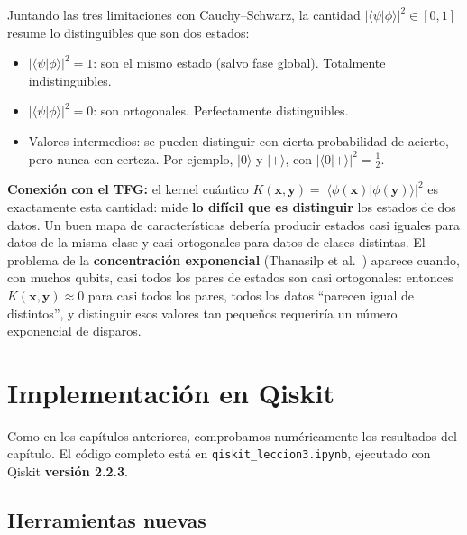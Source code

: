 \documentclass[11pt, a4paper, twoside, openright]{report}
\begin{document}
\begin{tcolorbox}[colback=blue!5!white,colframe=blue!75!black,title=\textbf{Nota Aclaratoria: El producto interno mide lo distinguibles que son dos estados}]
Juntando las tres limitaciones con Cauchy--Schwarz, la cantidad $|\langle\psi|\phi\rangle|^2\in[0,1]$ resume lo distinguibles que son dos estados:
\begin{itemize}
    \item $|\langle\psi|\phi\rangle|^2 = 1$: son el mismo estado (salvo fase global). Totalmente indistinguibles.
    \item $|\langle\psi|\phi\rangle|^2 = 0$: son ortogonales. Perfectamente distinguibles.
    \item Valores intermedios: se pueden distinguir con cierta probabilidad de acierto, pero nunca con certeza. Por ejemplo, $|0\rangle$ y $|+\rangle$, con $|\langle0|+\rangle|^2 = \frac12$.
\end{itemize}
\textbf{Conexión con el TFG:} el kernel cuántico $K(\mathbf{x},\mathbf{y}) = |\langle\phi(\mathbf{x})|\phi(\mathbf{y})\rangle|^2$ es exactamente esta cantidad: mide \textbf{lo difícil que es distinguir} los estados de dos datos. Un buen mapa de características debería producir estados casi iguales para datos de la misma clase y casi ortogonales para datos de clases distintas. El problema de la \textbf{concentración exponencial} (Thanasilp et al.\ \cite{thanasilp2024exponential}) aparece cuando, con muchos qubits, casi todos los pares de estados son casi ortogonales: entonces $K(\mathbf{x},\mathbf{y})\approx0$ para casi todos los pares, todos los datos ``parecen igual de distintos'', y distinguir esos valores tan pequeños requeriría un número exponencial de disparos.
\end{tcolorbox}

\cleardoublepage
\section{Implementación en Qiskit}

\noindent Como en los capítulos anteriores, comprobamos numéricamente los resultados del capítulo. El código completo está en \texttt{qiskit\_leccion3.ipynb}, ejecutado con Qiskit \textbf{versión 2.2.3}.

\subsection{Herramientas nuevas}
\end{document}
